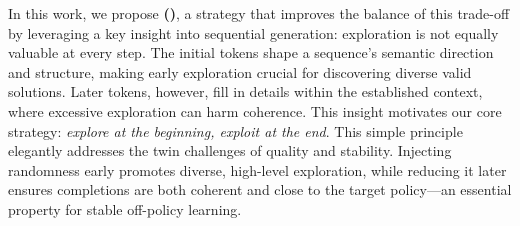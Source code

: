 In this work, we propose \textbf{\algname (\alg)}, a strategy that improves the balance of this trade-off by leveraging a key insight into sequential generation: exploration is not equally valuable at every step.
%
The initial tokens shape a sequence's semantic direction and structure, making early exploration crucial for discovering diverse valid solutions. 
%
Later tokens, however, fill in details within the established context, where excessive exploration can harm coherence.
%
This insight motivates our core strategy: \textit{explore at the beginning, exploit at the end}. 
%
This simple principle elegantly addresses the twin challenges of quality and stability. 
%
%
Injecting randomness early promotes diverse, high-level exploration, while reducing it later ensures completions are both coherent and close to the target policy---an essential property for stable off-policy learning.


